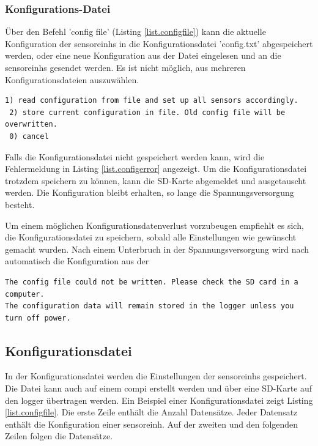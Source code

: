 \subsubsection{Konfigurations-Datei}\label{sssec.configfile}

Über den Befehl 'config file' (Listing \ref{list.configfile}) kann die aktuelle Konfiguration der \glspl{sensoreinh} in die Konfigurationsdatei 'config.txt' abgespeichert werden, oder eine neue Konfiguration aus der Datei eingelesen und an die \glspl{sensoreinh} gesendet werden. Es ist nicht möglich, aus mehreren Konfigurationsdateien auszuwählen.

\begin{lstlisting}[caption=Untermenü Konfigurationsdatei, label=list.config]
 1) read configuration from file and set up all sensors accordingly.
 2) store current configuration in file. Old config file will be overwritten.
 0) cancel
\end{lstlisting}

Falls die Konfigurationsdatei nicht gespeichert werden kann, wird die Fehlermeldung in Listing \ref{list.configerror} angezeigt. Um die Konfigurationsdatei trotzdem speichern zu können, kann die SD-Karte abgemeldet und ausgetauscht werden. Die Konfiguration bleibt erhalten, so lange die Spannungsversorgung besteht.

Um einem möglichen Konfigurationsdatenverlust vorzubeugen empfiehlt es sich, die Konfigurationsdatei zu speichern, sobald alle Einstellungen wie gewünscht gemacht wurden. Nach einem Unterbruch in der Spannungsversorgung wird nach automatisch die Konfiguration aus der 

\begin{lstlisting}[caption=Fehlermeldung beim Speichern der Konfigurationsdatei, label=list.configerror]
The config file could not be written. Please check the SD card in a computer.
The configuration data will remain stored in the logger unless you turn off power.
\end{lstlisting}

\subsection{Konfigurationsdatei}
In der Konfigurationsdatei werden die Einstellungen der \glspl{sensoreinh} gespeichert. Die Datei kann auch auf einem \gls{compi} erstellt werden und über eine SD-Karte auf den \gls{logger} übertragen werden. Ein Beispiel einer Konfigurationsdatei zeigt Listing \ref{list.configfile}. Die erste Zeile enthält die Anzahl Datensätze. Jeder Datensatz enthält die Konfiguration einer \gls{sensoreinh}. Auf der zweiten und den folgenden Zeilen folgen die Datensätze. 

